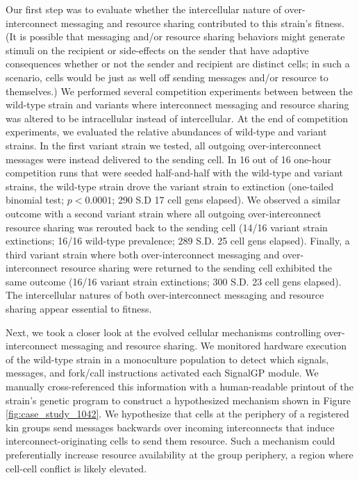 Our first step was to evaluate whether the intercellular nature of over-interconnect messaging and resource sharing contributed to this strain's fitness.
(It is possible that messaging and/or resource sharing behaviors might generate stimuli on the recipient or side-effects on the sender that have adaptive consequences whether or not the sender and recipient are distinct cells;
in such a scenario, cells would be just as well off sending messages and/or resource to themselves.)
We performed several competition experiments between between the wild-type strain and variants where interconnect messaging and resource sharing was altered to be intracellular instead of intercellular.
At the end of competition experiments, we evaluated the relative abundances of wild-type and variant strains.
In the first variant strain we tested, all outgoing over-interconnect messages were instead delivered to the sending cell.
In 16 out of 16 one-hour competition runs that were seeded half-and-half with the wild-type and variant strains, the wild-type strain drove the variant strain to extinction (one-tailed binomial test; $p < 0.0001$; 290 S.D 17 cell gens elapsed).
We observed a similar outcome with a second variant strain where all outgoing over-interconnect resource sharing was rerouted back to the sending cell (14/16 variant strain extinctions; 16/16 wild-type prevalence; 289 S.D. 25 cell gens elapsed).
Finally, a third variant strain where both over-interconnect messaging and over-interconnect resource sharing were returned to the sending cell exhibited the same outcome (16/16 variant strain extinctions; 300 S.D. 23 cell gens elapsed).
The intercellular natures of both over-interconnect messaging and resource sharing appear essential to fitness.

Next, we took a closer look at the evolved cellular mechanisms controlling over-interconnect messaging and resource sharing.
We monitored hardware execution of the wild-type strain in a monoculture population to detect which signals, messages, and fork/call instructions activated each SignalGP module.
We manually cross-referenced this information with a human-readable printout of the strain's genetic program to construct a hypothesized mechanism shown in Figure \ref{fig:case_study_1042}.
We hypothesize that cells at the periphery of a registered kin groups send messages backwards over incoming interconnects that induce interconnect-originating cells to send them resource.
Such a mechanism could preferentially increase resource availability at the group periphery, a region where cell-cell conflict is likely elevated.


